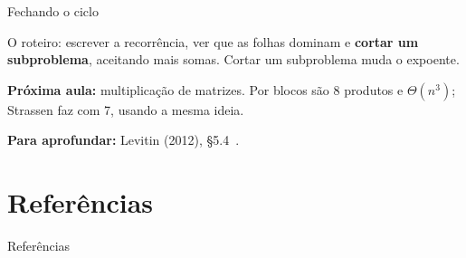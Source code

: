 \documentclass[aspectratio=169,xcolor=table]{beamer}
\newcommand{\fonte}[1]{%
  \vfill
  {\tiny\color{gray!55!black}\textbf{Para aprofundar:} #1\par}%
}
\begin{document}
\begin{frame}{Fechando o ciclo}
  \begin{center}
  \end{center}
  \medskip
  {\scriptsize
  O roteiro: escrever a recorrência, ver que as folhas dominam e \textbf{cortar um
  subproblema}, aceitando mais somas. Cortar um subproblema muda o expoente.
  \smallskip

  \textbf{Próxima aula:} multiplicação de matrizes. Por blocos são 8 produtos e
  $\Theta(n^3)$; Strassen faz com 7, usando a mesma ideia.}
  \fonte{Levitin (2012), \S 5.4~\cite{levitin2012introduction}.}
\end{frame}

\section*{Referências}
\begin{frame}[allowframebreaks]{Referências}
  \tiny
  \nocite{levitin2012introduction,cormen2009introduction,cormen2012algoritmos,kleinberg2006algorithm,dasgupta2008algorithms,knuth1997seminumerical,karatsuba1963multiplication,karatsuba1995complexity,schonhage1971schnelle,toom1963complexity,cook1966minimum,harvey2021integer,gmp2023manual,cpython2026longobject}
  
  
\end{frame}
\end{document}
